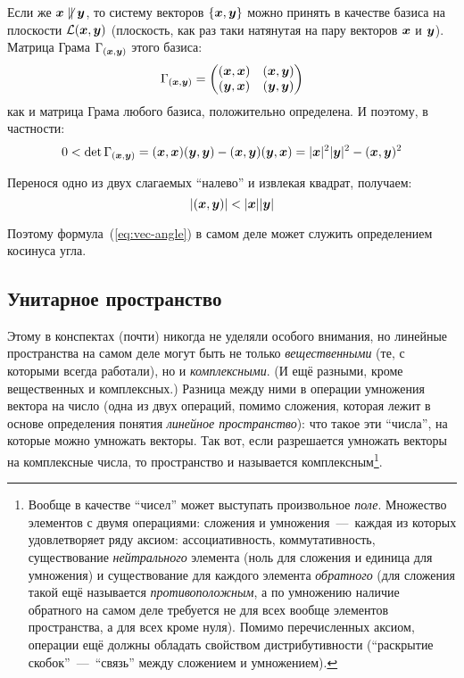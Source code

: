 \documentclass[a4paper,12pt]{article}
\begin{document}
  Если же $\bds x \hm{\not\parallel} \bds y$, то систему векторов $\{\boldsymbol x, \boldsymbol y\}$ можно принять в качестве базиса на плоскости $\mathcal L(\boldsymbol x, \boldsymbol y)$ (плоскость, как раз таки натянутая на пару векторов $\boldsymbol x$ и $\boldsymbol y$).
  Матрица Грама $\Gamma_{(\boldsymbol x, \boldsymbol y)}$ этого базиса:
  \[
    \Gamma_{(\boldsymbol x, \boldsymbol y)} = \begin{pmatrix}
      (\boldsymbol x, \boldsymbol x) & (\boldsymbol x, \boldsymbol y)\\
      (\boldsymbol y, \boldsymbol x) & (\boldsymbol y, \boldsymbol y)
    \end{pmatrix}
  \]
  как и матрица Грама любого базиса, положительно определена.
  И поэтому, в частности:
  \[
    0 < \det \Gamma_{(\boldsymbol x, \boldsymbol y)} = (\boldsymbol x, \boldsymbol x) (\boldsymbol y, \boldsymbol y) - (\boldsymbol x, \boldsymbol y) (\boldsymbol y, \boldsymbol x)
    = |\boldsymbol x|^2 |\boldsymbol y|^2 - (\boldsymbol x, \boldsymbol y)^2
  \]
  
  Перенося одно из двух слагаемых ``налево'' и извлекая квадрат, получаем:
  \[
    |(\boldsymbol x, \boldsymbol y)| < |\boldsymbol x| |\boldsymbol y|
  \]
  
  Поэтому формула~(\ref{eq:vec-angle}) в самом деле может служить определением косинуса угла.
  
  
  \subsection{Унитарное пространство}
  
  Этому в конспектах (почти) никогда не уделяли особого внимания, но линейные пространства на самом деле могут быть не только \emph{вещественными} (те, с которыми всегда работали), но и \emph{комплексными}.
  (И ещё разными, кроме вещественных и комплексных.)
  Разница между ними в операции умножения вектора на число (одна из двух операций, помимо сложения, которая лежит в основе определения понятия \emph{линейное пространство}): что такое эти ``числа'', на которые можно умножать векторы.
  Так вот, если разрешается умножать векторы на комплексные числа, то пространство и называется комплексным\footnote{Вообще в качестве ``чисел'' может выступать произвольное \emph{поле}. Множество элементов с двумя операциями: сложения и умножения~---~каждая из которых удовлетворяет ряду аксиом: ассоциативность, коммутативность, существование \emph{нейтрального} элемента (ноль для сложения и единица для умножения) и существование для каждого элемента \emph{обратного} (для сложения такой ещё называется \emph{противоположным}, а по умножению наличие обратного на самом деле требуется не для всех вообще элементов пространства, а для всех кроме нуля). Помимо перечисленных аксиом, операции ещё должны обладать свойством дистрибутивности (``раскрытие скобок''~---~``связь'' между сложением и умножением).}.
  
\end{document}
